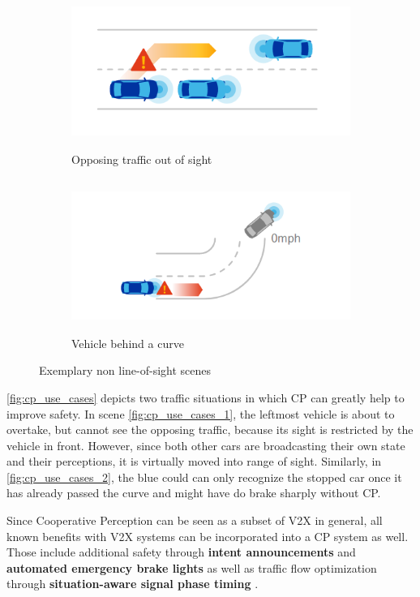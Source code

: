 \begin{figure}[h]
	
	\begin{subfigure}{0.5\textwidth}
		\includegraphics[width=1.0\linewidth, height=5cm]{98_images/nloss_2.png} 
		\caption{Opposing traffic out of sight}
		\label{fig:cp_use_cases_1}
	\end{subfigure}
	\begin{subfigure}{0.5\textwidth}
		\includegraphics[width=1.2\linewidth, height=5cm]{98_images/nloss_3.png}
		\caption{Vehicle behind a curve}
		\label{fig:cp_use_cases_2}
	\end{subfigure}
	
	\caption{Exemplary non line-of-sight scenes \cite{QualcommTechnologiesInc.2017}}
	\label{fig:cp_use_cases}
\end{figure}

\autoref{fig:cp_use_cases} depicts two traffic situations in which CP can greatly help to improve safety. In scene \autoref{fig:cp_use_cases_1}, the leftmost vehicle is about to overtake, but cannot see the opposing traffic, because its sight is restricted by the vehicle in front. However, since both other cars are broadcasting their own state and their perceptions, it is virtually moved into range of sight. Similarly, in \autoref{fig:cp_use_cases_2}, the blue could can only recognize the stopped car once it has already passed the curve and might have do brake sharply without CP.

Since Cooperative Perception can be seen as a subset of V2X in general, all known benefits with V2X systems can be incorporated into a CP system as well. Those include additional safety through \textbf{intent announcements} and \textbf{automated emergency brake lights} as well as traffic flow optimization through \textbf{situation-aware signal phase timing} \cite{5GAutomotiveAssociation2019b}.


